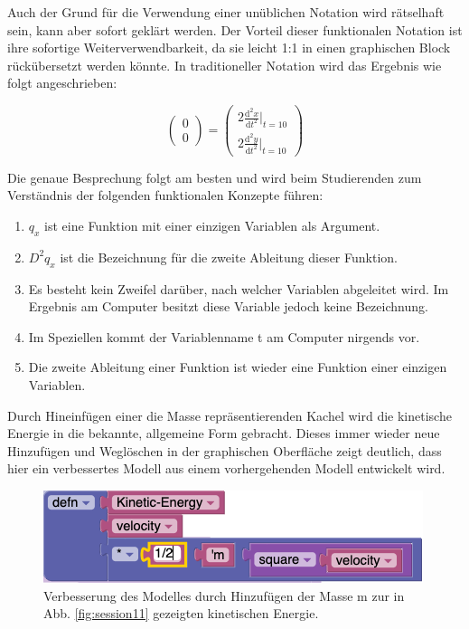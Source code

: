 \documentclass[twocolumn, 10pt]{article}
\begin{document}
Auch der Grund für die Verwendung einer unüblichen Notation wird rätselhaft sein, kann aber sofort geklärt werden. Der Vorteil dieser funktionalen Notation ist ihre sofortige Weiterverwendbarkeit, da sie leicht 1:1 in einen graphischen Block rückübersetzt werden könnte. In traditioneller Notation wird das Ergebnis wie folgt angeschrieben:

\begin{equation}
\begin{pmatrix} 0 \\ 0 \end{pmatrix} =
\begin{pmatrix} 
2 \frac{\mathrm d^2 x}{\mathrm d t^2} |_{t=10} \\ 
2 \frac{\mathrm d^2 y}{\mathrm d t^2} |_{t=10}
\end{pmatrix}
\end{equation}

Die genaue Besprechung folgt am besten \cite{cSussmanPaper 6} und wird beim Studierenden zum Verständnis der folgenden funktionalen Konzepte führen:

\begin{enumerate}[label=(\alph*)]
\item $q_x$ ist eine Funktion mit einer einzigen Variablen als Argument.
\item $D^2q_x$ ist die Bezeichnung für die zweite Ableitung dieser Funktion.
\item Es besteht kein Zweifel darüber, nach welcher Variablen abgeleitet wird. Im Ergebnis am Computer besitzt diese Variable jedoch keine Bezeichnung.
\item Im Speziellen kommt der Variablenname t am Computer nirgends vor.
\item Die zweite Ableitung einer Funktion ist wieder eine Funktion einer einzigen Variablen.
\end{enumerate}

Durch Hineinfügen einer die Masse repräsentierenden Kachel wird die kinetische Energie in die bekannte, allgemeine Form gebracht. Dieses immer wieder neue Hinzufügen und Weglöschen in der graphischen Oberfläche zeigt deutlich, dass hier ein verbessertes Modell aus einem vorhergehenden Modell entwickelt wird.

\begin{figure}[H]
\includegraphics[scale=0.4]{bilder/session_70.png}
\caption{Verbesserung des Modelles durch Hinzufügen der Masse m zur in Abb. \ref{fig:session11} gezeigten kinetischen Energie.}
\label{fig:session70}
\end{figure}
\end{document}
